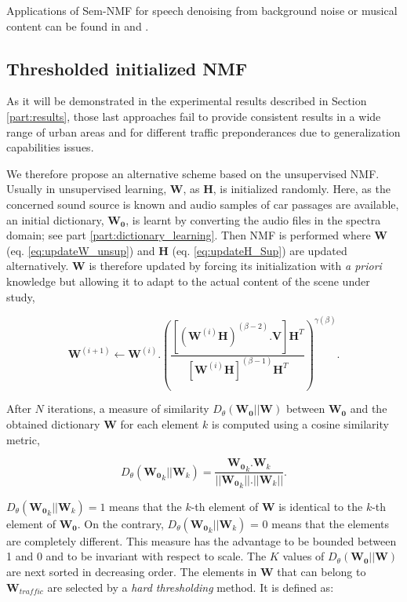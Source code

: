 \documentclass[twocolumn]{svjour3}          %
\begin{document}
Applications of Sem-NMF for speech denoising from background noise or musical content can be found in \cite{joder2012real} and \cite{weninger2012supervised}.

\subsection{Thresholded initialized NMF}

As it will be demonstrated in the experimental results described in Section \ref{part:results}, those last approaches fail to provide consistent results in a wide range of urban areas and for different traffic preponderances due to generalization capabilities issues.

We therefore propose an alternative scheme based on the unsupervised NMF. Usually in unsupervised learning, $\mathbf{W}$, as  $\mathbf{H}$, is initialized randomly. Here, as the concerned sound source is known and audio samples of car passages are available, an initial dictionary, $\mathbf{W_0}$, is learnt by converting the audio files in the spectra domain; see part \ref{part:dictionary_learning}. Then NMF is performed where $\mathbf{W}$ (eq. \ref{eq:updateW_unsup}) and $\mathbf{H}$ (eq.  \ref{eq:updateH_Sup}) are updated alternatively. $\mathbf{W}$ is therefore updated by forcing its initialization with \textit{a priori} knowledge but allowing it to adapt to the actual content of the scene under study,

\begin{equation}\label{eq:updateW_unsup}
\textbf{W}^{(i+1)} \leftarrow \mathbf{W}^{(i)}.\left(\frac{\left[\left(\mathbf{W}^{(i)}\mathbf{H} \right)^{(\beta-2)}.\mathbf{V} \right]\mathbf{H}^T}{\left[\mathbf{W}^{(i)}\mathbf{H} \right]^{(\beta-1)}\mathbf{H}^T}\right)^{\gamma(\beta)}.
\end{equation}

After $N$ iterations, a measure of similarity $D_{\theta}\left(\mathbf{W_0} \vert \vert \mathbf{W} \right)$ between $\mathbf{W_0}$ and the obtained dictionary $\mathbf{W}$ for each element $k$ is computed using a cosine similarity metric,

\begin{equation}
D_{\theta}\left(\mathbf{W_0}_k \vert \vert \mathbf{W}_k \right) = \frac{\mathbf{W_0}_k.\mathbf{W}_k}{\vert \vert \mathbf{W_0}_k  \vert \vert . \vert \vert \mathbf{W}_k \vert \vert}.
\end{equation}

$D_{\theta}\left(\mathbf{W_0}_k \vert \vert \mathbf{W}_k \right) = 1$ means that the $k$-th element of $\mathbf{W}$ is identical to the $k$-th element of $\mathbf{W_0}$. On the contrary, $D_{\theta}\left(\mathbf{W_0}_k \vert \vert \mathbf{W}_k \right)$ = 0 means that the elements are completely different. This measure has the advantage to be bounded between 1 and 0 and to be invariant with respect to scale. The $K$ values of $D_{\theta}\left(\mathbf{W_0} \vert \vert \mathbf{W} \right)$ are next sorted in decreasing order. The elements in $\mathbf{W}$ that can belong to $\mathbf{W}_{traffic}$ are selected by a \textit{hard thresholding} method. It is defined as:
\end{document}
